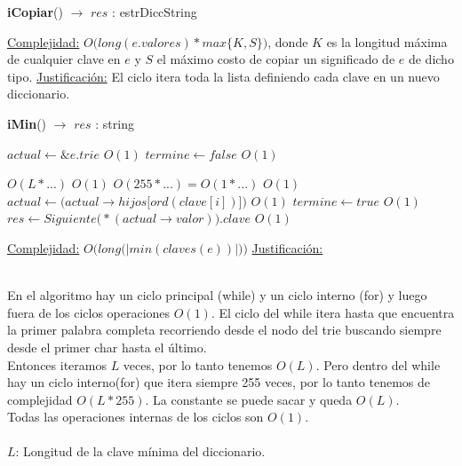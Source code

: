 \begin{Algoritmos}
\begin{algorithm}[H]{\textbf{iCopiar}() $\to$ $res$ : estrDiccString}
\begin{algorithmic}
        \medskip
        \Statex \underline{Complejidad:} {$O\big(long(e.valores) * max\{K, S\}\big)$, donde $K$ es la longitud máxima de cualquier clave en $e$ y $S$ el máximo costo de copiar un significado de $e$ de dicho tipo.}
        \Statex \underline{Justificación:} {El ciclo itera toda la lista definiendo cada clave en un nuevo diccionario.}
      \end{algorithmic}
\end{algorithm}

\begin{algorithm}[H]{\textbf{iMin}() $\to$ $res$ : string}
      \begin{algorithmic}
        \State $actual \gets \&e.trie$ \Comment $O(1)$
        \State $termine \gets false$ \Comment $O(1)$

         \Comment $O(L * ...)$
           \Comment $O(1)$
                 \Comment $O(255 * ...) = O(1 * ...)$
               \Comment $O(1)$
                \State $actual \gets \big(actual \to hijos\big[ord(clave[i])\big]\big)$ \Comment $O(1)$
              \EndIf
            \EndFor
          \Else
            \State $termine \gets true$ \Comment $O(1)$
            \State $res \gets Siguiente\big(*(actual \to valor)\big).clave$ \Comment $O(1)$
          \EndIf

        \EndWhile

        \medskip
        \Statex \underline{Complejidad:} {$O\big(long\big(|min(claves(e))|\big)\big)$}
        \Statex \underline{Justificación:} {\\
\quad\quad En el algoritmo hay un ciclo principal (while) y un ciclo interno (for) y luego fuera de los ciclos operaciones $O(1)$. El ciclo del while itera hasta que encuentra la primer palabra completa recorriendo desde el nodo del trie buscando siempre desde el primer char hasta el último. \\
\quad\quad Entonces iteramos $L$ veces, por lo tanto tenemos $O(L)$. Pero dentro del while hay un ciclo interno(for) que itera siempre 255 veces, por lo tanto tenemos de complejidad $O(L*255)$. La constante se puede sacar y queda $O(L)$. \\
\quad\quad Todas las operaciones internas de los ciclos son $O(1)$.\\
\\
\quad\quad $L$: Longitud de la clave mínima del diccionario.

}
\end{algorithmic}
\end{algorithm}
\end{Algoritmos}
